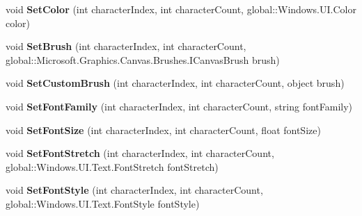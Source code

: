 \begin{DoxyCompactItemize}
void {\bfseries Set\+Color} (int character\+Index, int character\+Count, global\+::\+Windows.\+U\+I.\+Color color)
\item 
\mbox{\label{interface_microsoft_1_1_graphics_1_1_canvas_1_1_text_1_1_i_canvas_text_layout_a7f915acfc4ff40f7d367cb38220d6cbd}} 
void {\bfseries Set\+Brush} (int character\+Index, int character\+Count, global\+::\+Microsoft.\+Graphics.\+Canvas.\+Brushes.\+I\+Canvas\+Brush brush)
\item 
\mbox{\label{interface_microsoft_1_1_graphics_1_1_canvas_1_1_text_1_1_i_canvas_text_layout_aeddfc3e7e513bcfa6c67e5a5139a3558}} 
void {\bfseries Set\+Custom\+Brush} (int character\+Index, int character\+Count, object brush)
\item 
\mbox{\label{interface_microsoft_1_1_graphics_1_1_canvas_1_1_text_1_1_i_canvas_text_layout_aa9cb4ef464927909fcb48d72a4703b8a}} 
void {\bfseries Set\+Font\+Family} (int character\+Index, int character\+Count, string font\+Family)
\item 
\mbox{\label{interface_microsoft_1_1_graphics_1_1_canvas_1_1_text_1_1_i_canvas_text_layout_a8b0dd44121dd43e004f96f5df2498994}} 
void {\bfseries Set\+Font\+Size} (int character\+Index, int character\+Count, float font\+Size)
\item 
\mbox{\label{interface_microsoft_1_1_graphics_1_1_canvas_1_1_text_1_1_i_canvas_text_layout_a516ffa415e1689e878df56a857176c9a}} 
void {\bfseries Set\+Font\+Stretch} (int character\+Index, int character\+Count, global\+::\+Windows.\+U\+I.\+Text.\+Font\+Stretch font\+Stretch)
\item 
\mbox{\label{interface_microsoft_1_1_graphics_1_1_canvas_1_1_text_1_1_i_canvas_text_layout_a6d809f3be58dcdf67400baee7baa91dc}} 
void {\bfseries Set\+Font\+Style} (int character\+Index, int character\+Count, global\+::\+Windows.\+U\+I.\+Text.\+Font\+Style font\+Style)

\end{DoxyCompactItemize}
